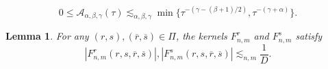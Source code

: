 \documentclass[10pt,a4paper]{amsart}
\newtheorem{lem}{Lemma}
\newcommand{\alp}{\alpha}
\newcommand{\br}[1]{\overline{#1}}
\newcommand{\bt}{\beta}
\newcommand{\calA}{\mathcal A}
\newcommand{\gmm}{\gamma}
\begin{document}
		\begin{equation}
			0\leq\calA_{\alp,\bt,\gmm}(\tau)\lesssim_{\alp,\bt,\gmm} \min\lbrace \tau^{-(\gmm-(\bt+1)/2)}, \tau^{-(\gmm+\alp)}\rbrace.
		\end{equation}

	\begin{lem}\label{lem:Frslow}
		For any $(r,s), (\br{r},\br{s})\in \Pi$, the kernels $F_{n,m}^{r}$ and $F_{n,m}^{s}$ satisfy
		\begin{equation}\label{eq:Frslow}
			|F_{n,m}^{r}(r,s,\br{r},\br{s})|, |F_{n,m}^{s}(r,s,\br{r},\br{s})|\lesssim_{n,m} \frac{1}{D}.%
		\end{equation} 
	\end{lem}
\end{document}
